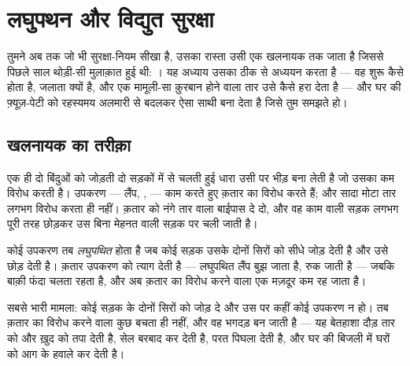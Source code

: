 \chapter{लघुपथन और विद्युत सुरक्षा}\label{ch:g7:short-circuits-safety}

तुमने अब तक जो भी सुरक्षा-नियम सीखा है, उसका रास्ता उसी एक खलनायक तक
जाता है जिससे पिछले साल थोड़ी-सी मुलाक़ात हुई थी: । यह अध्याय उसका
ठीक से अध्ययन करता है --- वह शुरू कैसे होता है, जलाता क्यों है, और एक
मामूली-सा क़ुरबान होने वाला तार उसे कैसे हरा देता है --- और घर की
फ़्यूज़-पेटी को रहस्यमय अलमारी से बदलकर ऐसा साथी बना देता है जिसे तुम
समझते हो।

\section{खलनायक का तरीक़ा}

\begin{proposition}[धारा को बिना मेहनत वाली सड़क पसंद है]\label{prop:g7:short-circuits-safety:effortless}
एक ही दो बिंदुओं को जोड़ती दो सड़कों में से चलती हुई धारा उसी पर भीड़
बना लेती है जो उसका कम विरोध करती है। उपकरण --- लैंप, ,  ---
काम करते हुए क़तार का विरोध करते हैं; और सादा मोटा तार लगभग विरोध करता
ही नहीं। क़तार को नंगे तार वाला बाईपास दे दो, और वह काम वाली सड़क
लगभग पूरी तरह छोड़कर उस बिना मेहनत वाली सड़क पर चली जाती है।
\end{proposition}

\begin{definition}\label{def:g7:short-circuits-safety:device}
कोई उपकरण तब \emph{लघुपथित} होता है जब कोई  सड़क
उसके दोनों सिरों को सीधे जोड़ देती है और उसे छोड़ देती है। क़तार उपकरण
को त्याग देती है --- लघुपथित लैंप बुझ जाता है,  रुक जाती है ---
जबकि बाक़ी फंदा चलता रहता है, और अब क़तार का विरोध करने वाला एक
मज़दूर कम रह जाता है।
\end{definition}

\begin{definition}[बैटरी का लघुपथन]\label{def:g7:short-circuits-safety:battery}
सबसे भारी मामला: कोई  सड़क \emph{} के दोनों सिरों को जोड़ दे
और उस पर कहीं कोई उपकरण न हो। तब क़तार का विरोध करने वाला कुछ बचता ही
नहीं, और वह भगदड़ बन जाती है --- यह बेतहाशा दौड़ तार को और ख़ुद 
को तपा देती है, सेल बरबाद कर देती है,  परत पिघला देती है,
और घर की बिजली में घरों को आग के हवाले कर देती है।
\end{definition}


